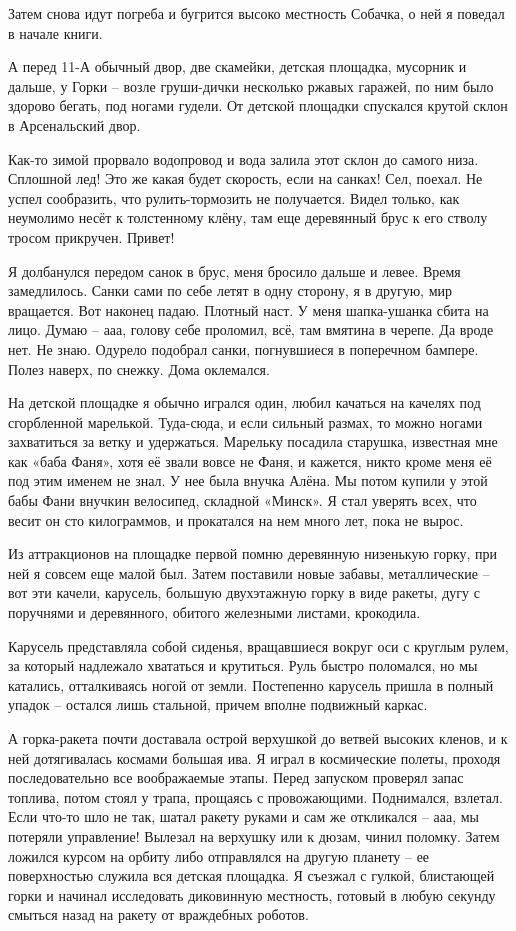 Затем снова идут погреба и бугрится высоко местность Собачка, о ней я поведал в начале книги.

А перед 11-А обычный двор, две скамейки, детская площадка, мусорник и дальше, у Горки – возле груши-дички несколько ржавых гаражей, по ним было здорово бегать, под ногами гудели. От детской площадки спускался крутой склон в Арсенальский двор.

Как-то зимой прорвало водопровод и вода залила этот склон до самого низа. Сплошной лед! Это же какая будет скорость, если на санках! Сел, поехал. Не успел сообразить, что рулить-тормозить не получается. Видел только, как неумолимо несёт к толстенному клёну, там еще деревянный брус к его стволу тросом прикручен. Привет!

Я долбанулся передом санок в брус, меня бросило дальше и левее. Время замедлилось. Санки сами по себе летят в одну сторону, я в другую, мир вращается. Вот наконец падаю. Плотный наст. У меня шапка-ушанка сбита на лицо. Думаю – ааа, голову себе проломил, всё, там вмятина в черепе. Да вроде нет. Не знаю. Одурело подобрал санки, погнувшиеся в поперечном бампере. Полез наверх, по снежку. Дома оклемался.

На детской площадке я обычно игрался один, любил качаться на качелях под сгорбленной марелькой. Туда-сюда, и если сильный размах, то можно ногами захватиться за ветку и удержаться. Марельку посадила старушка, известная мне как «баба Фаня», хотя её звали вовсе не Фаня, и кажется, никто кроме меня её под этим именем не знал. У нее была внучка Алёна. Мы потом купили у этой бабы Фани внучкин велосипед, складной «Минск». Я стал уверять всех, что весит он сто килограммов, и прокатался на нем много лет, пока не вырос.

Из аттракционов на площадке первой помню деревянную низенькую горку, при ней я совсем еще малой был. Затем поставили новые забавы, металлические – вот эти качели, карусель, большую двухэтажную горку в виде ракеты, дугу с поручнями и деревянного, обитого железными листами, крокодила.

Карусель представляла собой сиденья, вращавшиеся вокруг оси с круглым рулем, за который надлежало хвататься и крутиться. Руль быстро поломался, но мы катались, отталкиваясь ногой от земли. Постепенно карусель пришла в полный упадок – остался лишь стальной, причем вполне подвижный каркас.

А горка-ракета почти доставала острой верхушкой до ветвей высоких кленов, и к ней дотягивалась космами большая ива. Я играл в космические полеты, проходя последовательно все воображаемые этапы. Перед запуском проверял запас топлива, потом стоял у трапа, прощаясь с провожающими. Поднимался, взлетал. Если что-то шло не так, шатал ракету руками и сам же откликался – ааа, мы потеряли управление! Вылезал на верхушку или к дюзам, чинил поломку. Затем ложился курсом на орбиту либо отправлялся на другую планету – ее поверхностью служила вся детская площадка. Я съезжал с гулкой, блистающей горки и начинал исследовать диковинную местность, готовый в любую секунду смыться назад на ракету от враждебных роботов.

